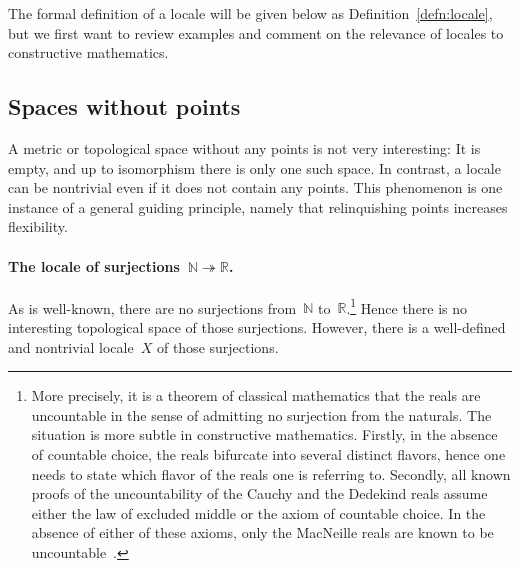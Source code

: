 \documentclass{ws-rv9x6}
\newcommand{\NN}{\mathbb{N}}
\newcommand{\RR}{\mathbb{R}}
\renewcommand{\_}{\mathpunct{.}}
\newcommand{\?}{\,{:}\,}
\begin{document}
The formal definition of a locale will be given below as
Definition~\ref{defn:locale}, but we first want to review examples and comment on
the relevance of locales to constructive mathematics.


\subsection{Spaces without points}
\label{sect:examples-no-points}

A metric or topological space without any points is not very interesting: It is
empty, and up to isomorphism there is only one such space. In contrast, a
locale can be nontrivial even if it does not contain any points. This
phenomenon is one instance of a general guiding principle, namely that relinquishing
points increases flexibility.

\paragraph{The locale of surjections~$\NN \twoheadrightarrow \RR$.} As is
well-known, there are no surjections from~$\NN$ to~$\RR$.\footnote{More
precisely, it is a theorem of classical mathematics that the reals are
uncountable in the sense of admitting no surjection from the naturals. The
situation is more subtle in constructive mathematics. Firstly, in the absence
of countable choice, the reals bifurcate into several distinct flavors, hence
one needs to state which flavor of the reals one is referring to. Secondly, all
known proofs of the uncountability of the Cauchy and the Dedekind reals assume
either the law of excluded middle or the axiom of countable choice. In the
absence of either of these axioms, only the MacNeille reals are known to be
uncountable~\cite{blechschmidt-hutzler:macneille}.} Hence there is no
interesting topological space of those surjections. However, there is a
well-defined and nontrivial locale~$X$ of those surjections.
\end{document}
